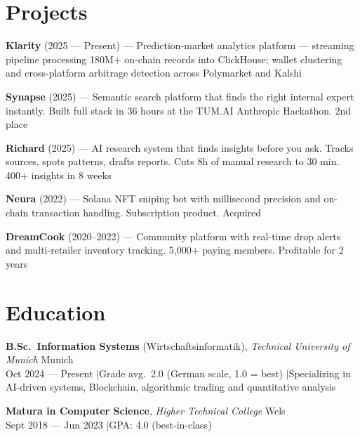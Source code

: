 \documentclass[a4paper,10pt]{article}
\begin{document}
\section{Projects}
\textbf{Klarity} {\small(2025 --- Present)} ---
Prediction-market analytics platform --- streaming pipeline processing 180M+ on-chain records into ClickHouse; wallet clustering and cross-platform arbitrage detection across Polymarket and Kalshi

\vspace{2pt}
\textbf{Synapse} {\small(2025)} ---
Semantic search platform that finds the right internal expert instantly. Built full stack in 36 hours at the TUM.AI \texttimes{} Anthropic Hackathon. 2nd place

\vspace{2pt}
\textbf{Richard} {\small(2025)} ---
AI research system that finds insights before you ask. Tracks sources, spots patterns, drafts reports. Cuts 8h of manual research to 30 min. 400+ insights in 8 weeks

\vspace{2pt}
\textbf{Neura} {\small(2022)} ---
Solana NFT sniping bot with millisecond precision and on-chain transaction handling. Subscription product. Acquired

\vspace{2pt}
\textbf{DreamCook} {\small(2020--2022)} ---
Community platform with real-time drop alerts and multi-retailer inventory tracking. 5,000+ paying members. Profitable for 2 years

\section{Education}
\textbf{B.Sc.\ Information Systems} (Wirtschaftsinformatik), \textit{Technical University of Munich} \hfill Munich \\
{\small Oct 2024 --- Present \enspace$\vert$\enspace Grade avg.\ 2.0 (German scale, 1.0 = best) \enspace$\vert$\enspace Specializing in AI-driven systems, Blockchain, algorithmic trading and quantitative analysis}

\vspace{3pt}
\textbf{Matura in Computer Science}, \textit{Higher Technical College} \hfill Wels \\
{\small Sept 2018 --- Jun 2023 \enspace$\vert$\enspace GPA: 4.0 (best-in-class)}
\end{document}

